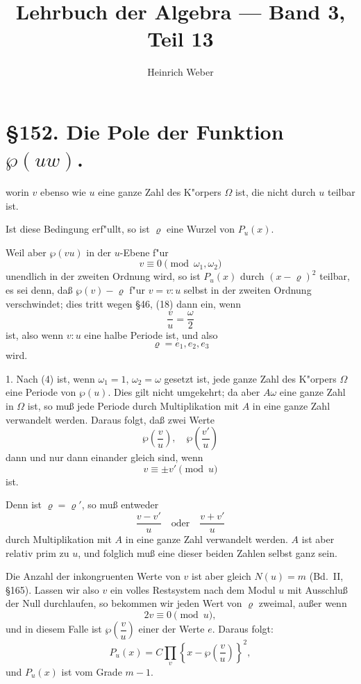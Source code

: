 \documentclass[12pt,a4paper]{article}
\title{Lehrbuch der Algebra --- Band 3, Teil 13}
\author{Heinrich Weber}
\date{}
\begin{document}
\maketitle
\thispagestyle{fancy}

\section*{\S 152. Die Pole der Funktion $\wp(uw)$.}

worin $v$ ebenso wie $u$ eine ganze Zahl des K"orpers $\Omega$ ist, die nicht durch $u$ teilbar ist.

Ist diese Bedingung erf"ullt, so ist $\varrho$ eine Wurzel von $P_u(x)$.

Weil aber $\wp(vu)$ in der $u$-Ebene f"ur
\[v \equiv 0 \pmod{\omega_1, \omega_2}\]
unendlich in der zweiten Ordnung wird, so ist $P_u(x)$ durch $(x - \varrho)^2$ teilbar, es sei denn, da\ss{} $\wp(v) - \varrho$ f"ur $v = v{:}u$ selbst in der zweiten Ordnung verschwindet; dies tritt wegen \S 46, (18) dann ein, wenn
\[\frac{v}{u} = \frac{\omega}{2}\]
ist, also wenn $v{:}u$ eine halbe Periode ist, und also
\begin{equation}\varrho = e_1, e_2, e_3\end{equation}
wird.

1. Nach (4) ist, wenn $\omega_1 = 1$, $\omega_2 = \omega$ gesetzt ist, jede ganze Zahl des K"orpers $\Omega$ eine Periode von $\wp(u)$. Dies gilt nicht umgekehrt; da aber $A\omega$ eine ganze Zahl in $\Omega$ ist, so mu\ss{} jede Periode durch Multiplikation mit $A$ in eine ganze Zahl verwandelt werden. Daraus folgt, da\ss{} zwei Werte
\[\wp\left(\frac{v}{u}\right), \quad \wp\left(\frac{v'}{u}\right)\]
dann und nur dann einander gleich sind, wenn
\[v \equiv \pm v' \pmod{u}\]
ist.

Denn ist $\varrho = \varrho'$, so mu\ss{} entweder
\[\frac{v-v'}{u} \quad \text{oder} \quad \frac{v+v'}{u}\]
durch Multiplikation mit $A$ in eine ganze Zahl verwandelt werden. $A$ ist aber relativ prim zu $u$, und folglich mu\ss{} eine dieser beiden Zahlen selbst ganz sein.

Die Anzahl der inkongruenten Werte von $v$ ist aber gleich $N(u) = m$ (Bd.~II, \S 165). Lassen wir also $v$ ein volles Restsystem nach dem Modul $u$ mit Ausschlu\ss{} der Null durchlaufen, so bekommen wir jeden Wert von $\varrho$ zweimal, au\ss{}er wenn
\begin{equation}2v \equiv 0 \pmod{u},\end{equation}
und in diesem Falle ist $\wp\left(\dfrac{v}{u}\right)$ einer der Werte $e$. Daraus folgt:
\begin{equation}P_u(x) = C\prod_{v} \left\{x - \wp\left(\frac{v}{u}\right)\right\}^2,\end{equation}
und $P_u(x)$ ist vom Grade $m-1$.
\end{document}
